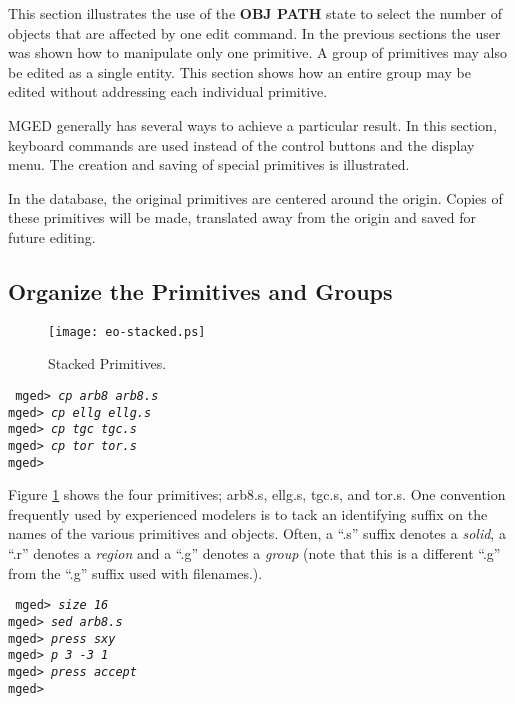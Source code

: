 This section illustrates the use of the {\bf OBJ PATH} state to select the
number of objects that are affected by one edit command.  In the previous
sections the user was shown how to manipulate only one primitive.  A group
of primitives may also be edited as a single entity.  This section
shows how an entire group may be edited without addressing each individual
primitive.

MGED generally has several ways to achieve a particular result.  In
this section, keyboard commands are used instead of the control buttons and
the display menu.  The creation and saving of special primitives is
illustrated.

In the database, the original primitives are centered around
the origin.  Copies of these primitives will be made, translated away
from the origin and saved for future editing.

\subsection{Organize the Primitives and Groups}

\begin{figure}
\centering \texttt{[image: eo-stacked.ps]}
\caption{Stacked Primitives.}
\label{eo-stacked}
\end{figure}

\noindent
{\tt
mged> {\em cp arb8 arb8.s}\\
mged> {\em cp ellg ellg.s}\\
mged> {\em cp tgc tgc.s}\\
mged> {\em cp tor tor.s}\\
mged>\\
}

Figure \ref{eo-stacked} shows the four primitives; arb8.s, ellg.s, tgc.s,
and tor.s.  One convention frequently used by experienced modelers is to
tack an identifying suffix on the names of the various primitives and
objects.  Often, a ``.s'' suffix denotes a {\em solid}, a ``.r'' denotes
a {\em region} and a ``.g'' denotes a {\em group} (note that this is a
different ``.g'' from the ``.g'' suffix used with filenames.).

\noindent
{\tt
mged> {\em size 16}\\
mged> {\em sed arb8.s}\\
mged> {\em press sxy}\\
mged> {\em p 3 -3 1}\\
mged> {\em press accept}\\
mged>\\
}


